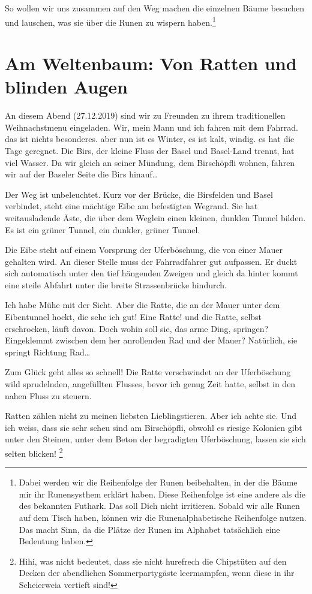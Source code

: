 \documentclass[11pt,titlepage,a5paper]{book}
\begin{document}
So wollen wir uns zusammen auf den Weg machen die einzelnen Bäume besuchen und lauschen, was sie über die Runen zu wispern haben.\footnote{Dabei werden wir die Reihenfolge der Runen beibehalten, in der die Bäume mir ihr Runensysthem erklärt haben. Diese Reihenfolge ist eine andere als die des bekannten Futhark. Das soll Dich nicht irritieren. Sobald wir alle Runen auf dem Tisch haben, können wir die Runenalphabetische Reihenfolge nutzen. Das macht Sinn, da die Plätze der Runen im Alphabet tatsächlich eine Bedeutung haben.}

\section{Am Weltenbaum: Von Ratten und blinden Augen}

An diesem Abend (27.12.2019) sind wir zu Freunden zu ihrem traditionellen Weihnachstmenu eingeladen. Wir, mein Mann und ich fahren mit dem Fahrrad. das ist nichts besonderes. aber nun ist es Winter, es ist kalt, windig. es hat die Tage geregnet. Die Birs, der kleine Fluss der Basel und Basel-Land trennt, hat viel Wasser. Da wir gleich an seiner Mündung, dem Birschöpfli wohnen, fahren wir auf der Baseler Seite die Birs hinauf\dots

Der Weg ist unbeleuchtet. Kurz vor der Brücke, die Birsfelden und Basel verbindet, steht eine mächtige Eibe am befestigten Wegrand. Sie hat weitausladende Äste, die über dem Weglein einen kleinen, dunklen Tunnel bilden. Es ist ein grüner Tunnel, ein dunkler, grüner Tunnel.

Die Eibe steht auf einem Vorsprung der Uferböschung, die von einer Mauer gehalten wird. An dieser Stelle muss der Fahrradfahrer gut aufpassen. Er duckt sich automatisch unter den tief hängenden Zweigen und gleich da hinter kommt eine steile Abfahrt unter die breite Strassenbrücke hindurch. 

Ich habe Mühe mit der Sicht. Aber die Ratte, die an der Mauer unter dem Eibentunnel hockt, die sehe ich gut! Eine Ratte! und die Ratte, selbst erschrocken, läuft davon. Doch wohin soll sie, das arme Ding, springen? Eingeklemmt zwischen dem her anrollenden Rad und der Mauer? Natürlich, sie springt Richtung Rad\dots

Zum Glück geht alles so schnell! Die Ratte verschwindet an der Uferböschung wild sprudelnden, angefüllten Flusses, bevor ich genug Zeit hatte, selbst in den nahen Fluss zu steuern.

Ratten zählen nicht zu meinen liebsten Lieblingstieren. Aber ich achte sie. Und ich weiss, dass sie sehr scheu sind am Birschöpfli, obwohl es riesige Kolonien gibt unter den Steinen, unter dem Beton der begradigten Uferböschung, lassen sie sich selten blicken! \footnote{Hihi, was nicht bedeutet, dass sie nicht hurefrech die Chipstüten auf den Decken der abendlichen Sommerpartygäste leermampfen, wenn diese in ihr Scheierweia vertieft sind!} 
\end{document}
